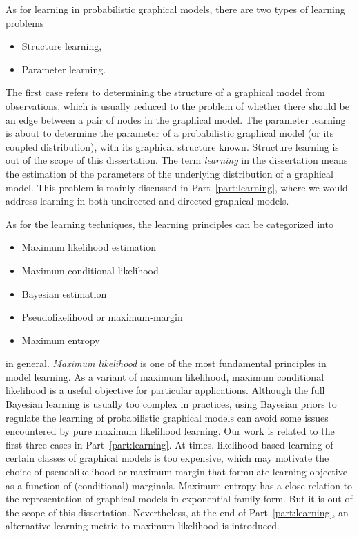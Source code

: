 As for learning in probabilistic graphical models, there are two types of learning problems
\begin{itemize}
\item Structure learning,
\item Parameter learning.
\end{itemize}
The first case refers to determining the structure of a graphical model from observations, which is usually reduced to the problem of whether there should be an edge between a pair of nodes in the graphical model. The parameter learning is about to determine the parameter of a probabilistic graphical model (or its coupled distribution), with its graphical structure known. Structure learning is out of the scope of this dissertation. The term \textit{learning} in the dissertation means the estimation of the parameters of the underlying distribution of a graphical model. This problem is mainly discussed in Part~\ref{part:learning}, where we would address learning in both undirected and directed graphical models. 


As for the learning techniques, the learning principles can be categorized into
\begin{itemize}
\item Maximum likelihood estimation
\item Maximum conditional likelihood
\item Bayesian estimation
\item Pseudolikelihood or maximum-margin
\item Maximum entropy
\end{itemize}
in general. \textit{Maximum likelihood} is one of the most fundamental principles in model learning. As a variant of maximum likelihood, maximum conditional likelihood is a useful objective for particular applications. Although the full Bayesian learning is usually too complex in practices, using Bayesian priors to regulate the learning of probabilistic graphical models can avoid some issues encountered by pure maximum likelihood learning.
Our work is related to the first three cases in Part~\ref{part:learning}. At times, likelihood based learning of certain classes of graphical models is too expensive, which may motivate the choice of pseudolikelihood or maximum-margin that formulate learning objective as a function of (conditional) marginals. Maximum entropy has a close relation to the representation of graphical models in exponential family form. But it is out of the scope of this dissertation. Nevertheless, at the end of Part~\ref{part:learning}, an alternative learning metric to maximum likelihood is introduced.

